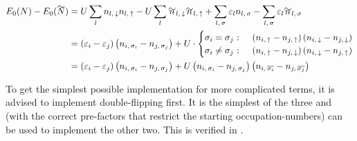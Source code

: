 \begin{equation}
    \label{eq:simplified-base-energy-hopping}
    \begin{split}
        E_0(N)-E_0(\vphantom{N}\smash{\tilde{N}}) 
        & = U\lsum n_{l,\,\down}n_{l,\,\up}-U\lsum \tilde{n}_{l,\,\down}\tilde{n}_{l,\,\up} 
        + \lsum[l,\,\sigma] \epsl n_{l,\,\sigma} - \lsum[l,\,\sigma] \epsl \tilde{n}_{l,\,\sigma}\\
        & =  \left(\epsl[i]-\epsl[j]\right)\left(n_{i,\,\sigma_i} - n_{j,\,\sigma_j}\right) +
        U\cdot \begin{cases}
            \sigma_i = \sigma_j\text{ : } & \left(n_{i,\,\up}-n_{j,\,\up}\right) \left(n_{i,\,\down}-n_{j,\,\down}\right)\\
            \sigma_i \neq \sigma_j\text{ : } & \left(n_{i,\,\up}-n_{j,\,\down}\right) \left(n_{i,\,\down}-n_{j,\,\up}\right)
        \end{cases}\\
        & = \left(\epsl[i]-\epsl[j]\right)\left(n_{i,\,\sigma_i} - n_{j,\,\sigma_j}\right) +
        U \left(n_{i,\,\sigma_i}-n_{j,\,\sigma_j}\right) \left(n_{i,\,\overline{\sigma_i}}-n_{j,\,\overline{\sigma_j}}\right)
    \end{split}
\end{equation}

To get the simplest possible implementation for more complicated terms, it is advised to implement double-flipping first.
It is the simplest of the three and (with the correct pre-factors that restrict the starting occupation-numbers) can be used to implement the other two.
This is verified in .
